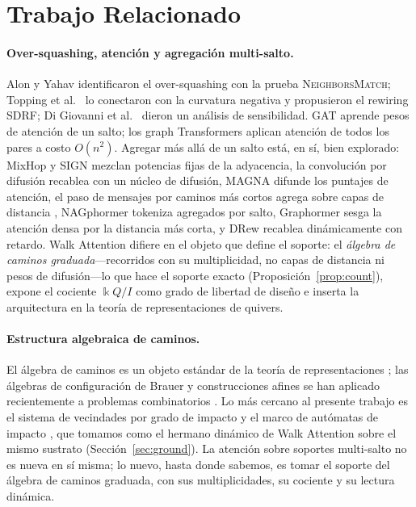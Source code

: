 \documentclass[runningheads]{llncs}
\newcommand{\kk}{\Bbbk}
\newcommand{\kQ}{\kk Q}
\begin{document}
\section{Trabajo Relacionado}\label{sec:related}

\paragraph{Over-squashing, atención y agregación multi-salto.}
Alon y Yahav \cite{alon2021bottleneck} identificaron el over-squashing con la
prueba \textsc{NeighborsMatch}; Topping et al.\ \cite{topping2022understanding}
lo conectaron con la curvatura negativa y propusieron el rewiring SDRF; Di
Giovanni et al.\ \cite{digiovanni2023oversquashing} dieron un análisis de
sensibilidad.
GAT \cite{velickovic2017graph} aprende pesos de atención de un salto; los graph
Transformers aplican atención de todos los pares \cite{vaswani2017attention} a
costo $O(n^2)$.
Agregar más allá de un salto está, en sí, bien explorado: MixHop
\cite{abu2019mixhop} y SIGN \cite{frasca2020sign} mezclan potencias fijas de la
adyacencia, la convolución por difusión \cite{gasteiger2019diffusion} recablea
con un núcleo de difusión, MAGNA \cite{wang2021magna} difunde los puntajes de
atención, el paso de mensajes por caminos más cortos agrega sobre capas de
distancia \cite{abboud2022shortest}, NAGphormer \cite{chen2023nagphormer}
tokeniza agregados por salto, Graphormer \cite{ying2021graphormer} sesga la
atención densa por la distancia más corta, y DRew \cite{gutteridge2023drew}
recablea dinámicamente con retardo. Walk Attention difiere en el objeto que
define el soporte: el \emph{álgebra de caminos graduada}---recorridos con su
multiplicidad, no capas de distancia ni pesos de difusión---lo que hace el
soporte exacto (Proposición~\ref{prop:count}), expone el cociente $\kQ/I$ como
grado de libertad de diseño e inserta la arquitectura en la teoría de
representaciones de quivers.

\paragraph{Estructura algebraica de caminos.}
El álgebra de caminos es un objeto estándar de la teoría de representaciones
\cite{schiffler2014quiver,assem2006elements}; las álgebras de configuración de
Brauer y construcciones afines se han aplicado recientemente a problemas
combinatorios \cite{moreno2021brauer,moreno2024integer}. Lo más cercano al presente trabajo
es el sistema de vecindades por grado de impacto y el marco de autómatas de
impacto \cite{zainea2026aiq,ibanez2025casimulations}, que tomamos como el
hermano dinámico de Walk Attention sobre el mismo sustrato
(Sección~\ref{sec:ground}). La atención sobre soportes multi-salto no es nueva
en sí misma; lo nuevo, hasta donde sabemos, es tomar el soporte del álgebra de
caminos graduada, con sus multiplicidades, su cociente y su lectura dinámica.
\end{document}
